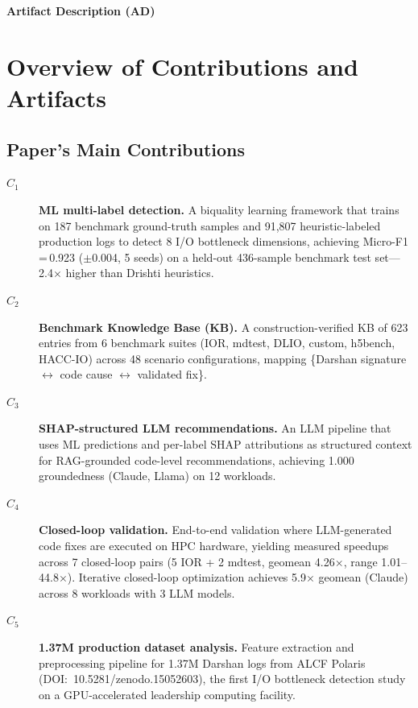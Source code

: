 \documentclass[conference]{IEEEtran}
\newcommand{\apppart}[1]{%
\vspace{2ex}
\begin{center}\begin{large}\textbf{#1}\end{large}\end{center}\par
}
\newcommand{\appendixAD}{\apppart{Artifact Description (AD)}}
\begin{document}


\appendixAD

\section{Overview of Contributions and Artifacts}

\subsection{Paper's Main Contributions}

\begin{description}
\item[$C_1$] \textbf{ML multi-label detection.}
A biquality learning framework that trains on 187 benchmark ground-truth samples
and 91{,}807 heuristic-labeled production logs to detect 8 I/O bottleneck
dimensions, achieving Micro-F1\,=\,0.923 ($\pm$0.004, 5 seeds) on a held-out
436-sample benchmark test set---2.4$\times$ higher than Drishti heuristics.

\item[$C_2$] \textbf{Benchmark Knowledge Base (KB).}
A construction-verified KB of 623 entries from 6 benchmark suites
(IOR, mdtest, DLIO, custom, h5bench, HACC-IO) across 48 scenario
configurations, mapping \{Darshan signature $\leftrightarrow$ code cause
$\leftrightarrow$ validated fix\}.

\item[$C_3$] \textbf{SHAP-structured LLM recommendations.}
An LLM pipeline that uses ML predictions and per-label
SHAP attributions as structured context for RAG-grounded code-level
recommendations, achieving 1.000 groundedness (Claude, Llama) on 12 workloads.

\item[$C_4$] \textbf{Closed-loop validation.}
End-to-end validation where LLM-generated code fixes are executed on HPC
hardware, yielding measured speedups across 7 closed-loop pairs
(5 IOR + 2 mdtest, geomean 4.26$\times$, range 1.01--44.8$\times$).
Iterative closed-loop optimization achieves 5.9$\times$ geomean (Claude)
across 8 workloads with 3 LLM models.

\item[$C_5$] \textbf{1.37M production dataset analysis.}
Feature extraction and preprocessing pipeline for 1.37M Darshan logs from
ALCF Polaris (DOI:~10.5281/zenodo.15052603), the first I/O bottleneck
detection study on a GPU-accelerated leadership computing facility.
\end{description}
\end{document}
